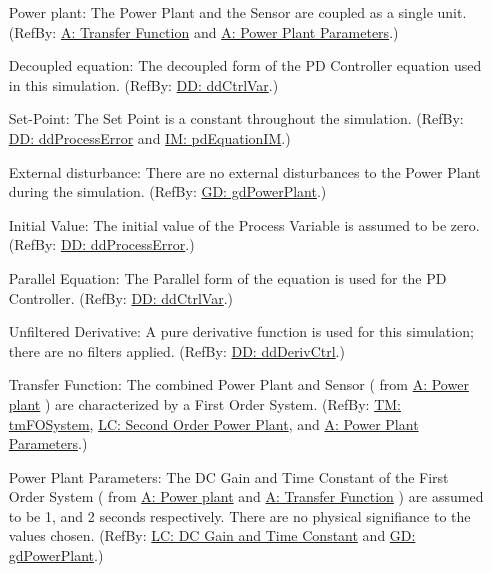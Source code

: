 \documentclass[12pt]{article}
\begin{document}
\begin{itemize}
\item[Power plant:\phantomsection\label{pwrPlant}]{The Power Plant and the Sensor are coupled as a single unit. (RefBy: \hyperref[pwrPlantTxFnx]{A: Transfer Function} and \hyperref[dcGainTimeConst]{A: Power Plant Parameters}.)}
\item[Decoupled equation:\phantomsection\label{decoupled}]{The decoupled form of the PD Controller equation used in this simulation. (RefBy: \hyperref[DD:ddCtrlVar]{DD: ddCtrlVar}.)}
\item[Set-Point:\phantomsection\label{setPoint}]{The Set Point is a constant throughout the simulation. (RefBy: \hyperref[DD:ddProcessError]{DD: ddProcessError} and \hyperref[IM:pdEquationIM]{IM: pdEquationIM}.)}
\item[External disturbance:\phantomsection\label{externalDistub}]{There are no external disturbances to the Power Plant during the simulation. (RefBy: \hyperref[GD:gdPowerPlant]{GD: gdPowerPlant}.)}
\item[Initial Value:\phantomsection\label{initialValue}]{The initial value of the Process Variable is assumed to be zero. (RefBy: \hyperref[DD:ddProcessError]{DD: ddProcessError}.)}
\item[Parallel Equation:\phantomsection\label{parallelEq}]{The Parallel form of the equation is used for the PD Controller. (RefBy: \hyperref[DD:ddCtrlVar]{DD: ddCtrlVar}.)}
\item[Unfiltered Derivative:\phantomsection\label{unfilteredDerivative}]{A pure derivative function is used for this simulation; there are no filters applied. (RefBy: \hyperref[DD:ddDerivCtrl]{DD: ddDerivCtrl}.)}
\item[Transfer Function:\phantomsection\label{pwrPlantTxFnx}]{The combined Power Plant and Sensor ( from  \hyperref[pwrPlant]{A: Power plant}  ) are characterized by a First Order  System. (RefBy: \hyperref[TM:tmFOSystem]{TM: tmFOSystem}, \hyperref[likeChgIC]{LC: Second Order Power Plant}, and \hyperref[dcGainTimeConst]{A: Power Plant Parameters}.)}
\item[Power Plant Parameters:\phantomsection\label{dcGainTimeConst}]{The DC Gain and Time Constant of the First Order System ( from \hyperref[pwrPlant]{A: Power plant} and \hyperref[pwrPlantTxFnx]{A: Transfer Function} ) are assumed to be 1, and 2 seconds respectively. There are no physical signifiance to the values chosen. (RefBy: \hyperref[likeChgPP]{LC: DC Gain and Time Constant} and \hyperref[GD:gdPowerPlant]{GD: gdPowerPlant}.)}
\end{itemize}
\end{document}
